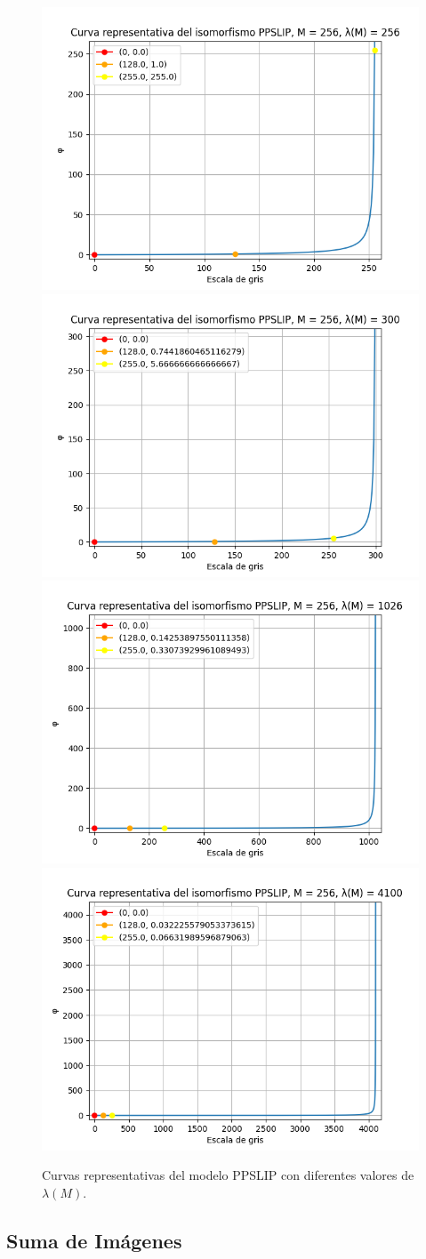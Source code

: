 \begin{figure}
	\begin{center}
		\includegraphics[width=5.5 cm]{images/ppslip_curves/ppslip_curve_256.png}
		\includegraphics[width=5.5 cm]{images/ppslip_curves/ppslip_curve_300.png}
		\includegraphics[width=5.5 cm]{images/ppslip_curves/ppslip_curve_1026.png}
		\includegraphics[width=5.5 cm]{images/ppslip_curves/ppslip_curve_4100.png}
		\caption{Curvas representativas del modelo PPSLIP con diferentes valores de $\lambda(M)$.}
	\end{center}
\end{figure}

\subsection{Suma de Im\'agenes}

